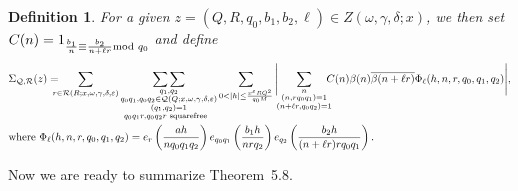 \documentclass{amsart}
\newtheorem{defn}{Definition}
\numberwithin{equation}{section}
\begin{document}
\begin{defn}
\medskip For a given $z=(Q,R,q_0,b_1,b_2,\ell) \in Z(\omega,\gamma,\delta;x)$, we then set  $C(n)  = 1_{\substack{\frac{b_1}{n}  \equiv \frac{b_2}{n+\ell r} \mbox{{\scriptsize  mod }} q_0}}
$ and   define 
\begin{align*}
&\Sigma_{\mathcal{Q}, \mathcal{R}}(z)= \!\!\!\!\! \sum_{\substack{ r \in \mathcal{R}(R;x,\omega,\gamma,\delta,\varepsilon) }}  \mathop{\sum\sum}\limits_{\substack{q_1, q_2 \\ q_0 q_1,q_0 q_2 \in \mathcal{Q}(Q;x,\omega,\gamma,\delta,\varepsilon) \\ (q_1,q_2)=1 \\  q_0q_1r, q_0q_2r \mbox{\begin{scriptsize}
squarefree
\end{scriptsize} }
}} \sum_{0<|h| \leq \frac{x^\varepsilon RQ^2}{q_0 M}}    \Bigg| \!\!\sum_{\substack{n \\ (n,rq_0q_1 )=1 \\ (n+\ell r, q_0q_2)=1 }} \!\!\!\!C(n)\beta(n)\overline{\beta(n+\ell r)}  \Phi_\ell(h,n,r,q_0,q_1,q_2) \Bigg|,\\
&\mbox{where } \Phi_\ell(h,n,r,q_0,q_1,q_2) =  e_r\left(\dfrac{ah}{nq_0q_1q_2}\right)e_{q_0q_1}\left(\dfrac{b_1h}{nrq_2}\right)e_{q_2}\left(\dfrac{b_2h}{(n+\ell r)rq_0q_1}\right).
\end{align*}

\end{defn}


\medskip

Now we are ready to summarize Theorem~5.8.
\end{document}
